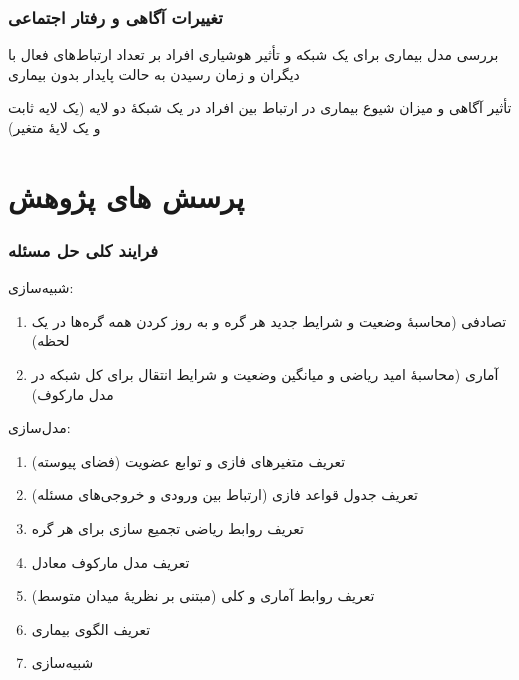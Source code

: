 \documentclass[xcolor=dvipsnames, professionalfonts, aspectratio=169, 11pt]{beamer}
\begin{document}
\begin{frame}
    \frametitle{تغییرات آگاهی و رفتار اجتماعی}

    \begin{moredi}
        \item بررسی مدل بیماری  برای یک شبکه و تأثیر هوشیاری افراد بر تعداد ارتباط‌های فعال با دیگران و زمان رسیدن به حالت پایدار بدون بیماری \cite{li2019control,bhowmick2020influence}
        \item تأثیر آگاهی و میزان شیوع بیماری در ارتباط بین افراد در یک شبکهٔ دو لایه (یک لایه ثابت و یک لایهٔ متغیر)\cite{sahneh2019contact}
    \end{moredi}

\end{frame}

\section{پرسش های پژوهش}
\begin{frame}
    \frametitle{فرایند کلی حل مسئله}
    {
        شبیه‌سازی:
        \begin{enumerate}\RTList
            \item<-1> تصادفی (محاسبهٔ وضعیت و شرایط جدید هر گره و به روز کردن همه گره‌ها در یک لحظه)
            \item<2-> آماری (محاسبهٔ امید ریاضی و میانگین وضعیت و شرایط انتقال برای کل شبکه در مدل مارکوف)

        \end{enumerate}

        مدل‌سازی:
        \begin{enumerate}\RTList
            \item تعریف متغیرهای فازی و توابع عضویت (فضای پیوسته)
            \item تعریف جدول قواعد فازی (ارتباط بین ورودی و خروجی‌های مسئله)
            \item تعریف روابط ریاضی تجمیع سازی برای هر گره
            \item<2-> تعریف مدل مارکوف معادل
            \item<2-> تعریف روابط آماری و کلی (مبتنی بر نظریهٔ میدان متوسط)
            \item<1> تعریف الگوی بیماری
            \item شبیه‌سازی

        \end{enumerate}
    }
\end{frame}
\end{document}
